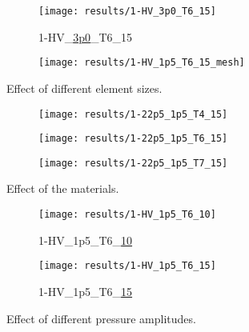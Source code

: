 \begin{figure}
    \centering
    \begin{subfigure}[b]{0.45\textwidth}
        \centering
        \texttt{[image: results/1-HV\_3p0\_T6\_15]}
        \caption{1-HV\_\textcolor{tab:red}{\underline{3p0}}\_T6\_15}
        \label{fig:1-HV_3p0_T6_15}
    \end{subfigure}
    \begin{subfigure}[b]{0.45\textwidth}
        \centering
        \texttt{[image: results/1-HV\_1p5\_T6\_15\_mesh]}
        \caption{}
        \label{fig:1-HV_1p5_T6_15_mesh}
    \end{subfigure}
    \caption{Effect of different element sizes.}
    \label{fig:effect_element}
\end{figure}

\begin{figure}
    \centering
    \begin{subfigure}[b]{0.32\textwidth}
        \centering
        \texttt{[image: results/1-22p5\_1p5\_T4\_15]}
        \caption{}
        \label{fig:T4}
    \end{subfigure}
    \begin{subfigure}[b]{0.32\textwidth}
        \centering
        \texttt{[image: results/1-22p5\_1p5\_T6\_15]}
        \caption{}
        \label{fig:T6}
    \end{subfigure}
    \begin{subfigure}[b]{0.32\textwidth}
        \centering
        \texttt{[image: results/1-22p5\_1p5\_T7\_15]}
        \caption{}
        \label{fig:T7}
    \end{subfigure}
    \caption{Effect of the materials.}
    \label{fig:effect_material}
\end{figure}

\begin{figure}
    \centering
    \begin{subfigure}[b]{0.45\textwidth}
        \centering
        \texttt{[image: results/1-HV\_1p5\_T6\_10]}
        \caption{1-HV\_1p5\_T6\_\textcolor{tab:red}{\underline{10}}}
        \label{fig:1-HV_1p5_T6_10}
    \end{subfigure}
    \begin{subfigure}[b]{0.45\textwidth}
        \centering
        \texttt{[image: results/1-HV\_1p5\_T6\_15]}
        \caption{1-HV\_1p5\_T6\_\textcolor{tab:red}{\underline{15}}}
        \label{fig:1-HV_1p5_T6_15_amp}
    \end{subfigure}
    \caption{Effect of different pressure amplitudes.}
    \label{fig:effect_amp}
\end{figure}

